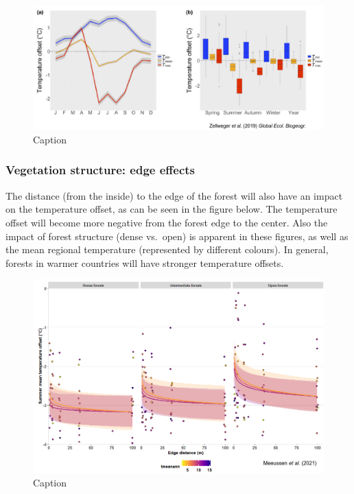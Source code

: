 \documentclass[12pt,oneside]{book}
\begin{document}
\begin{figure}

{\centering \includegraphics[width=1\linewidth]{figures/Figure1020} 

}

\caption{Caption}\label{fig:Micro20}
\end{figure}

\subsubsection{Vegetation structure: edge
effects}\label{vegetation-structure-edge-effects}

The distance (from the inside) to the edge of the forest will also have
an impact on the temperature offset, as can be seen in the figure below.
The temperature offset will become more negative from the forest edge to
the center. Also the impact of forest structure (dense vs.~open) is
apparent in these figures, as well as the mean regional temperature
(represented by different colours). In general, forests in warmer
countries will have stronger temperature offsets.

\begin{figure}

{\centering \includegraphics[width=1\linewidth]{figures/Figure1021} 

}

\caption{Caption}\label{fig:Micro21}
\end{figure}
\end{document}
